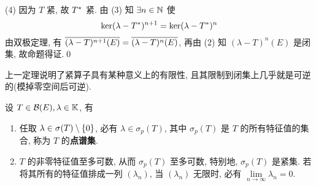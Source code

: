 \begin{Proof}
        (4) 因为 $ T $ 紧, 故 $ \Star{T} $ 紧. 由 (3) 知 $ \exists n\in\N $ 使
        \[
            \ker(\lambda-\Star{T})^{n+1}=\ker(\lambda-\Star{T})^{n}
        \]
        由双极定理, 有 $ \baro{(\lambda-T)^{n+1}(E)}=\baro{(\lambda-T)^{n}(E)} $, 再由 (2) 知 $ (\lambda-T)^{n}(E) $ 是闭集, 故命题得证.\qed
    \end{Proof}

    \begin{Remark}
        上一定理说明了紧算子具有某种意义上的有限性, 且其限制到闭集上几乎就是可逆的(模掉零空间后可逆).
    \end{Remark}

    \begin{Theorem}\label{thm:紧算子的点谱集性质}
        设 $ T\in\CB(E), \lambda\in\K $, 有
        \begin{enumerate}[(1)]
            \item 任取 $ \lambda\in\sigma(T)\sm \{ 0 \} $, 必有 $ \lambda\in\sigma_{p}(T) $, 其中 $ \sigma_{p}(T) $ 是 $ T $ 的所有特征值的集合, 称为 $ T $ 的\textbf{点谱集}.
            \item $ T $ 的非零特征值至多可数, 从而 $ \sigma_{p}(T) $ 至多可数, 特别地,  $ \sigma_{p}(T) $ 是紧集. 若将其所有的特征值排成一列 $ (\lambda_{n}) $, 当 $ (\lambda_{n}) $ 无限时, 必有 $ \lim\limits_{n\to\infty}\lambda_{n}=0 $.
        \end{enumerate}
    \end{Theorem}
